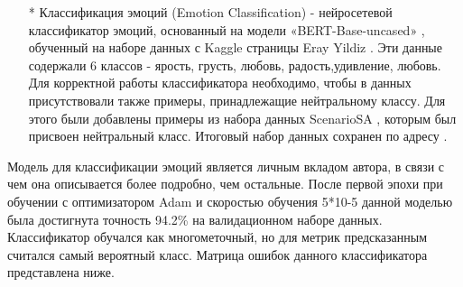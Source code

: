 \begin{itemize}
\item[*] Классификация эмоций (Emotion Classification) -  нейросетевой классификатор эмоций, основанный на модели «BERT-Base-uncased» , обученный на наборе данных с Kaggle страницы Eray Yildiz \cite{na_website_ndp_emo}. Эти данные содержали 6 классов - ярость, грусть, любовь, радость,удивление, любовь. Для корректной работы классификатора необходимо, чтобы в данных присутствовали также примеры, принадлежащие нейтральному классу. Для этого были добавлены примеры из набора данных ScenarioSA \cite{scenariosa}, которым был присвоен нейтральный класс. Итоговый набор данных сохранен по адресу \cite{na_website_ndo_emo}.
\end{itemize}
Модель для классификации эмоций является личным вкладом автора, в связи с чем она описывается более подробно, чем остальные. После первой эпохи при обучении с оптимизатором Adam и скоростью обучения 5*10-5 данной моделью была достигнута точность 94.2\% на валидационном наборе данных. Классификатор обучался как многометочный, но для метрик предсказанным считался самый вероятный класс. Матрица ошибок данного классификатора представлена ниже.


\begin{table}[htbp]
\centering
\caption {Матрица ошибок классификатора эмоций из Alexa Prize Challenge 3}
\label{tab:dream1}%
\end{table}



